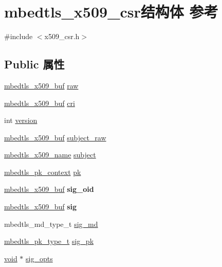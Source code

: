 \hypertarget{structmbedtls__x509__csr}{}\section{mbedtls\+\_\+x509\+\_\+csr结构体 参考}
\label{structmbedtls__x509__csr}


{\ttfamily \#include $<$x509\+\_\+csr.\+h$>$}

\subsection*{Public 属性}
\begin{DoxyCompactItemize}
\item 
\hyperlink{group__x509__module_ga4d02c9e8e4e2934555e0d132cd2976dc}{mbedtls\+\_\+x509\+\_\+buf} \hyperlink{structmbedtls__x509__csr_ad3c60458143eb1ddedfa573466931a70}{raw}
\item 
\hyperlink{group__x509__module_ga4d02c9e8e4e2934555e0d132cd2976dc}{mbedtls\+\_\+x509\+\_\+buf} \hyperlink{structmbedtls__x509__csr_a6adcb10c37a6bc946310d54567468f8a}{cri}
\item 
int \hyperlink{structmbedtls__x509__csr_a455e44fb96cdcd346788e0a41d7ab2b5}{version}
\item 
\hyperlink{group__x509__module_ga4d02c9e8e4e2934555e0d132cd2976dc}{mbedtls\+\_\+x509\+\_\+buf} \hyperlink{structmbedtls__x509__csr_ad85a7b3987a80254911b8d48a1beb78f}{subject\+\_\+raw}
\item 
\hyperlink{group__x509__module_ga2272228c7776102328df31623af3168c}{mbedtls\+\_\+x509\+\_\+name} \hyperlink{structmbedtls__x509__csr_a0c403df635495f8cba9b3e1001fc4491}{subject}
\item 
\hyperlink{structmbedtls__pk__context}{mbedtls\+\_\+pk\+\_\+context} \hyperlink{structmbedtls__x509__csr_abacfec387e945f59a35a106eebba0a1c}{pk}
\item 
\mbox{\label{structmbedtls__x509__csr_a2d9ee56aee03832cb531eb78a53224f4}} 
\hyperlink{group__x509__module_ga4d02c9e8e4e2934555e0d132cd2976dc}{mbedtls\+\_\+x509\+\_\+buf} {\bfseries sig\+\_\+oid}
\item 
\mbox{\label{structmbedtls__x509__csr_a2ba91f0de1e1002cb569db90781f954c}} 
\hyperlink{group__x509__module_ga4d02c9e8e4e2934555e0d132cd2976dc}{mbedtls\+\_\+x509\+\_\+buf} {\bfseries sig}
\item 
mbedtls\+\_\+md\+\_\+type\+\_\+t \hyperlink{structmbedtls__x509__csr_afaf345aa794cfd4b5056ce49a67bb611}{sig\+\_\+md}
\item 
\hyperlink{pk_8h_a3fe41eff5605ae727eb9d28dad297020}{mbedtls\+\_\+pk\+\_\+type\+\_\+t} \hyperlink{structmbedtls__x509__csr_a670fac5f5b5cd7398e1b241dc257bc97}{sig\+\_\+pk}
\item 
\hyperlink{interfacevoid}{void} $\ast$ \hyperlink{structmbedtls__x509__csr_ac1152e686c27158c211b2c3fdfaefdb7}{sig\+\_\+opts}
\end{DoxyCompactItemize}


